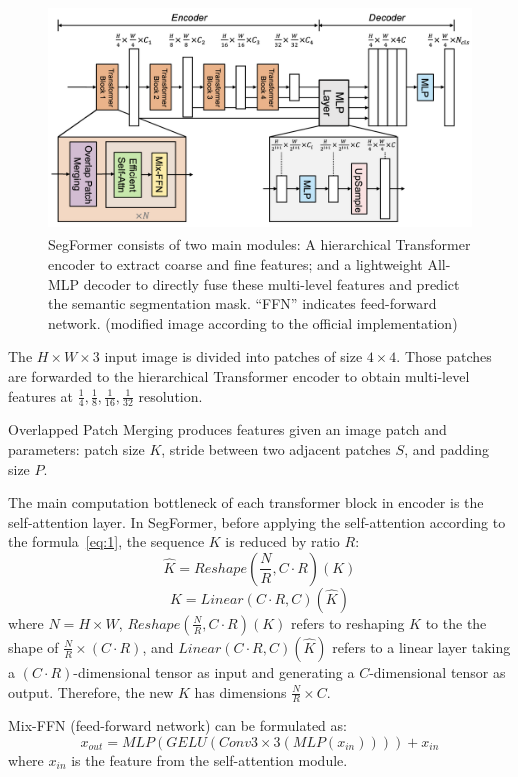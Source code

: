 \begin{figure}[h] %
    \centering
    \includegraphics[height=60mm]{figures/03_segformer_overview.png} %
    \caption{SegFormer consists of two main modules: A hierarchical Transformer encoder to extract coarse and fine features; and a lightweight All-MLP decoder to directly fuse these multi-level features and predict the semantic segmentation mask. “FFN” indicates feed-forward network. (modified image \cite{xie2021segformer} according to the official implementation)} %
    \label{fig:segformer_over} %
\end{figure} 

The $H\times W \times 3$ input image is divided into patches of size $4\times 4$. Those patches are forwarded to the hierarchical Transformer encoder to obtain multi-level features at $\frac{1}{4}, \frac{1}{8}, \frac{1}{16}, \frac{1}{32}$ resolution.

Overlapped Patch Merging produces features given an image patch and parameters: patch size $K$, stride between two adjacent patches $S$, and padding size $P$.

The main computation bottleneck of each transformer block in encoder is the self-attention layer. In SegFormer, before applying the self-attention according to the formula~\ref{eq:1}, the sequence $K$ is reduced by ratio $R$:
$$\hat{K} = Reshape(\frac{N}{R}, C\cdot R)(K)$$
$$K = Linear(C \cdot R, C)(\hat{K})$$
where $N = H \times W$, $Reshape(\frac{N}{R}, C \cdot R)(K)$ refers to reshaping $K$ to the the shape of $\frac{N}{R} \times (C \cdot R)$, and $Linear(C \cdot R, C)(\hat{K})$ refers to a linear layer taking a $(C \cdot R)$-dimensional tensor as input and generating a $C$-dimensional tensor as output. Therefore, the new $K$ has dimensions $\frac{N}{R} \times C$.  

Mix-FFN (feed-forward network) can be formulated as:
$$x_{out} = MLP(GELU(Conv 3\times 3(MLP(x_{in})))) + x_{in}$$
where $x_{in}$ is the feature from the self-attention module.

